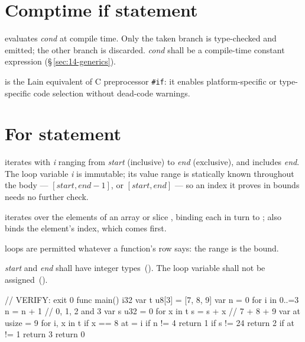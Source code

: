 \section{Comptime if statement}
\label{sec:stmt.comptime-if}

\pnum
{} evaluates
\textit{cond} at compile time.  Only the taken branch is type-checked and
emitted; the other branch is discarded.  \textit{cond} shall be a
compile-time constant expression (\S\,\ref{sec:14-generics}).

\begin{note}
   is the Lain equivalent of C preprocessor
  \texttt{\#if}: it enables platform-specific or type-specific code
  selection without dead-code warnings.
\end{note}

\section{For statement}
\label{sec:stmt.for}

\pnum
{} iterates with \textit{i} ranging
from \textit{start} (inclusive) to \textit{end} (exclusive), and
 includes \textit{end}.  The loop variable \textit{i} is
immutable; its value range is statically known throughout the body ---
$[\textit{start}, \textit{end}-1]$, or $[\textit{start}, \textit{end}]$ --- so an index it
proves in bounds needs no further check.

\pnum
{} iterates over the elements of an array or slice ,
binding each in turn to ;  also binds the element's index,
which comes first.

\pnum
{} loops are permitted whatever a function's row says: the range is the bound.

\begin{constraint}
  \textit{start} and \textit{end} shall have integer types~().  The loop
  variable shall not be assigned~().
\end{constraint}

\begin{laincode}
// VERIFY: exit 0
func main() i32 {
    var t u8[3] = [7, 8, 9]
    var n = 0
    for i in 0..=3 { n = n + 1 }        // 0, 1, 2 and 3
    var s u32 = 0
    for x in t { s = s + x }            // 7 + 8 + 9
    var at usize = 9
    for i, x in t {
        if x == 8 { at = i }
    }
    if n != 4 { return 1 }
    if s != 24 { return 2 }
    if at != 1 { return 3 }
    return 0
}
\end{laincode}
